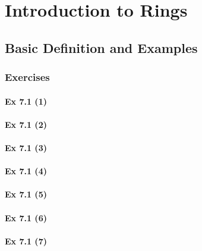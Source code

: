\setcounter{chapter}{0}
\renewcommand{\thechapter}{7}
\chapter{Introduction to Rings}\label{ch:7}
\setcounter{equation}{0}	        %

\section{Basic Definition and Examples}\label{sec:7.1}	
\subsection*{Exercises}\label{sec:7.1_Exercises}

\subsubsection{Ex 7.1 (1)}\label{sec:Ex_7.1.1}

\subsubsection{Ex 7.1 (2)}\label{sec:Ex_7.1.2}

\subsubsection{Ex 7.1 (3)}\label{sec:Ex_7.1.3}

\subsubsection{Ex 7.1 (4)}\label{sec:Ex_7.1.4}

\subsubsection{Ex 7.1 (5)}\label{sec:Ex_7.1.5}

\subsubsection{Ex 7.1 (6)}\label{sec:Ex_7.1.6}

\subsubsection{Ex 7.1 (7)}\label{sec:Ex_7.1.7}

